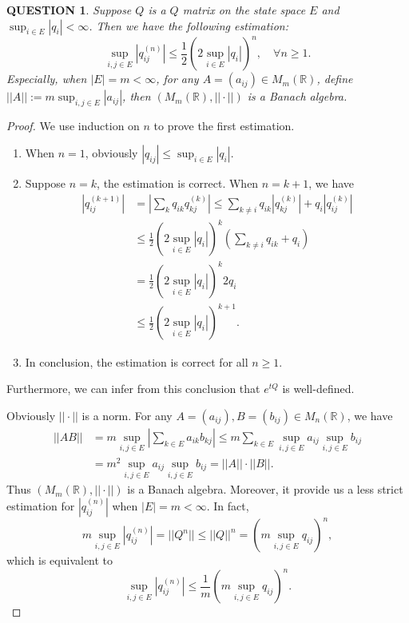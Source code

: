 \documentclass[12pt]{article}
\renewcommand{\(}{\left(}%
\renewcommand{\)}{\right)}%
\renewcommand{\[}{\left[}%
\renewcommand{\]}{\right]}%
\renewcommand{\r}{\mathbb{R}}
\newtheorem{question}{QUESTION}[section]}
\newtheorem{proof}{Proof.}}
\begin{document}
  \begin{question}
  	Suppose $Q$ is a $Q$ matrix on the state space $E$ and $\sup_{i\in E}|q_{i}|<\infty$. Then we have the following estimation:
  	\begin{equation*}
  		\sup_{i,j\in E}|q_{ij}^{(n)}|\leq  \frac{1}{2} \(2\sup_{i\in E}|q_{i}|\)^n,\quad  \forall n\geq 1.
  	\end{equation*}
  	Especially, when $|E|=m<\infty$, for any $A=(a_{ij})\in M_m(\r)$, define $||A||:=m\sup_{i,j\in E}|a_{ij}|$, then $(M_m(\r),||\cdot||)$ is a Banach algebra.
  \end{question}
  \begin{proof}
  	We use induction on $n$ to prove the first estimation. 
  	\begin{enumerate}
  		\item When $n=1$, obviously $|q_{ij}|\leq \sup_{i\in E}|q_{i}|$.
  		\item Suppose $n=k$, the estimation is correct. When $n=k+1$, we have
  		\begin{equation*}
  			\begin{split}
  				|q_{ij}^{(k+1)}|&=\left|\sum_{k}q_{ik}q_{kj}^{(k)} \right|\leq \sum_{k\neq i}q_{ik}|q_{kj}^{(k)}|+q_i|q_{ij}^{(k)}|\\
  				&\leq \frac{1}{2} \(2\sup_{i\in E}|q_{i}|\)^k\(\sum_{k\neq i}q_{ik}+q_i \)\\
  				&=\frac{1}{2} \(2\sup_{i\in E}|q_{i}|\)^k2q_i\\
  				&\leq \frac{1}{2} \(2\sup_{i\in E}|q_{i}|\)^{k+1}.
  			\end{split}
  		\end{equation*}
  		\item In conclusion, the estimation is correct for all $n\geq 1$.
  	\end{enumerate}
  	Furthermore, we can infer from this conclusion that $e^{tQ}$ is well-defined.
  	
  	Obviously $||\cdot||$ is a norm. For any $A=(a_{ij}),B=(b_{ij})\in M_n(\r)$, we have
  	\begin{equation*}
  		\begin{split}
  			||AB||&=m\sup_{i,j\in E}\left|\sum_{k\in E}a_{ik}b_{kj}\right|\leq m\sum_{k\in E}\sup_{i,j\in E}a_{ij}\sup_{i,j\in E}b_{ij}\\
  			&=m^2\sup_{i,j\in E}a_{ij}\sup_{i,j\in E}b_{ij}=||A||\cdot||B||.
  		\end{split}
  	\end{equation*}
  	Thus $(M_m(\r),||\cdot||)$ is a Banach algebra. Moreover, it provide us a less strict estimation for $|q_{ij}^{(n)}|$ when $|E|=m<\infty$. In fact, 
  	\begin{equation*}
  		m\sup_{i,j\in E}|q_{ij}^{(n)}|=||Q^n||\leq ||Q||^n=\(m\sup_{i,j\in E}q_{ij}\)^n,
  	\end{equation*}
  	which is equivalent to
  	\begin{equation*}
  		\sup_{i,j\in E}|q_{ij}^{(n)}|\leq \frac{1}{m}\(m\sup_{i,j\in E}q_{ij}\)^n.
  	\end{equation*}
  \end{proof}
  
\end{document}
